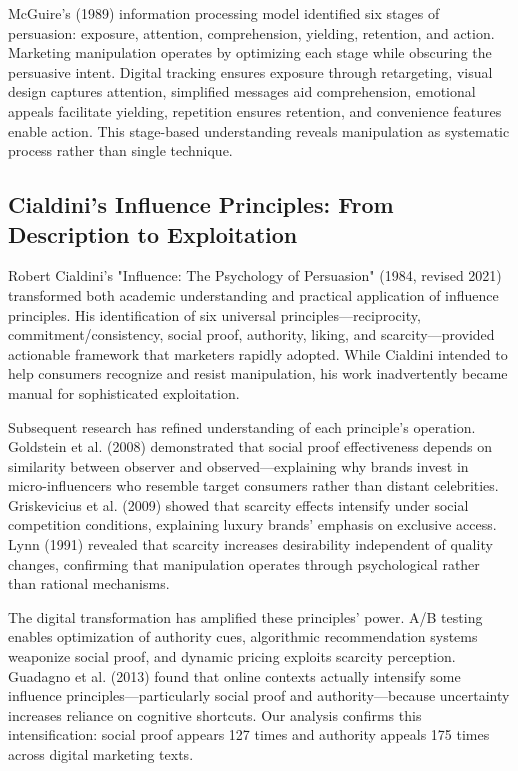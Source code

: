 McGuire's (1989) information processing model identified six stages of persuasion: exposure, attention, comprehension, yielding, retention, and action. Marketing manipulation operates by optimizing each stage while obscuring the persuasive intent. Digital tracking ensures exposure through retargeting, visual design captures attention, simplified messages aid comprehension, emotional appeals facilitate yielding, repetition ensures retention, and convenience features enable action. This stage-based understanding reveals manipulation as systematic process rather than single technique.

\subsection{Cialdini's Influence Principles: From Description to Exploitation}

Robert Cialdini's "Influence: The Psychology of Persuasion" (1984, revised 2021) transformed both academic understanding and practical application of influence principles. His identification of six universal principles—reciprocity, commitment/consistency, social proof, authority, liking, and scarcity—provided actionable framework that marketers rapidly adopted. While Cialdini intended to help consumers recognize and resist manipulation, his work inadvertently became manual for sophisticated exploitation.

Subsequent research has refined understanding of each principle's operation. Goldstein et al. (2008) demonstrated that social proof effectiveness depends on similarity between observer and observed—explaining why brands invest in micro-influencers who resemble target consumers rather than distant celebrities. Griskevicius et al. (2009) showed that scarcity effects intensify under social competition conditions, explaining luxury brands' emphasis on exclusive access. Lynn (1991) revealed that scarcity increases desirability independent of quality changes, confirming that manipulation operates through psychological rather than rational mechanisms.

The digital transformation has amplified these principles' power. A/B testing enables optimization of authority cues, algorithmic recommendation systems weaponize social proof, and dynamic pricing exploits scarcity perception. Guadagno et al. (2013) found that online contexts actually intensify some influence principles—particularly social proof and authority—because uncertainty increases reliance on cognitive shortcuts. Our analysis confirms this intensification: social proof appears 127 times and authority appeals 175 times across digital marketing texts.

